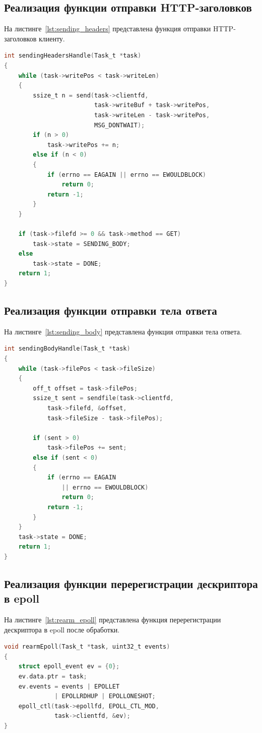 \subsection{Реализация функции отправки HTTP-заголовков}
На листинге~\ref{lst:sending_headers} представлена функция отправки
HTTP-заголовков клиенту.

\begin{lstlisting}[caption={Реализация функции отправки HTTP-заголовков},label={lst:sending_headers},language=C]
int sendingHeadersHandle(Task_t *task)
{
    while (task->writePos < task->writeLen)
    {
        ssize_t n = send(task->clientfd,
                         task->writeBuf + task->writePos,
                         task->writeLen - task->writePos,
                         MSG_DONTWAIT);
        if (n > 0)
            task->writePos += n;
        else if (n < 0)
        {
            if (errno == EAGAIN || errno == EWOULDBLOCK)
                return 0;
            return -1;
        }
    }

    if (task->filefd >= 0 && task->method == GET)
        task->state = SENDING_BODY;
    else
        task->state = DONE;
    return 1;
}
\end{lstlisting}

\subsection{Реализация функции отправки тела ответа}
На листинге~\ref{lst:sending_body} представлена функция отправки
тела ответа. 
\begin{lstlisting}[caption={Реализация функции отправки тела ответа через sendfile},label={lst:sending_body},language=C]
int sendingBodyHandle(Task_t *task)
{
    while (task->filePos < task->fileSize)
    {
        off_t offset = task->filePos;
        ssize_t sent = sendfile(task->clientfd,
            task->filefd, &offset,
            task->fileSize - task->filePos);

        if (sent > 0)
            task->filePos += sent;
        else if (sent < 0)
        {
            if (errno == EAGAIN
                || errno == EWOULDBLOCK)
                return 0;
            return -1;
        }
    }
    task->state = DONE;
    return 1;
}
\end{lstlisting}

\subsection{Реализация функции перерегистрации дескриптора в epoll}
На листинге~\ref{lst:rearm_epoll} представлена функция перерегистрации
дескриптора в epoll после обработки. 
\begin{lstlisting}[caption={Реализация функции перерегистрации дескриптора в epoll},label={lst:rearm_epoll},language=C]
void rearmEpoll(Task_t *task, uint32_t events)
{
    struct epoll_event ev = {0};
    ev.data.ptr = task;
    ev.events = events | EPOLLET
              | EPOLLRDHUP | EPOLLONESHOT;
    epoll_ctl(task->epollfd, EPOLL_CTL_MOD,
              task->clientfd, &ev);
}
\end{lstlisting}

